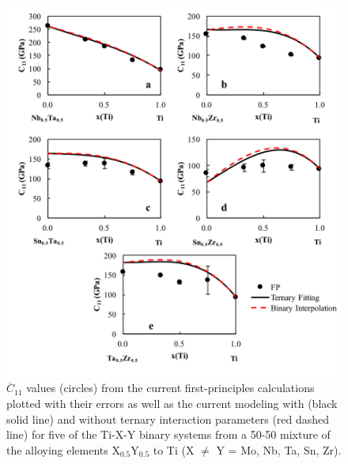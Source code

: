\pagebreak
\begin{figure}[H]
	\centering
	\includegraphics[width=\textwidth]{Chapter-6/Figures/tixyc112.png}
	\caption{$\overline{C}_{11}$ values (circles) from the current first-principles calculations plotted with their errors as well as the current modeling with (black solid line) and without ternary interaction parameters (red dashed line) for five of the Ti-X-Y binary systems from a 50-50 mixture of the alloying elements X$_{0.5}$Y$_{0.5}$ to Ti (X $\neq$ Y = Mo, Nb, Ta, Sn, Zr).}
	\label{Ch6-figure:tixyc11_2}
\end{figure}


